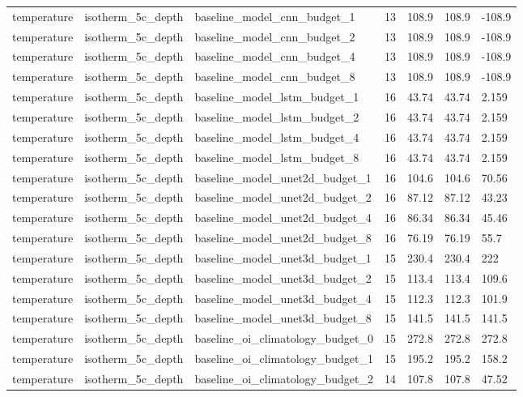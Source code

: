 \begin{table}[htbp]
\begin{tabular}{lllllll}
temperature & isotherm\_5c\_depth & baseline\_model\_cnn\_budget\_1 & 13 & 108.9 & 108.9 & -108.9 \\
temperature & isotherm\_5c\_depth & baseline\_model\_cnn\_budget\_2 & 13 & 108.9 & 108.9 & -108.9 \\
temperature & isotherm\_5c\_depth & baseline\_model\_cnn\_budget\_4 & 13 & 108.9 & 108.9 & -108.9 \\
temperature & isotherm\_5c\_depth & baseline\_model\_cnn\_budget\_8 & 13 & 108.9 & 108.9 & -108.9 \\
temperature & isotherm\_5c\_depth & baseline\_model\_lstm\_budget\_1 & 16 & 43.74 & 43.74 & 2.159 \\
temperature & isotherm\_5c\_depth & baseline\_model\_lstm\_budget\_2 & 16 & 43.74 & 43.74 & 2.159 \\
temperature & isotherm\_5c\_depth & baseline\_model\_lstm\_budget\_4 & 16 & 43.74 & 43.74 & 2.159 \\
temperature & isotherm\_5c\_depth & baseline\_model\_lstm\_budget\_8 & 16 & 43.74 & 43.74 & 2.159 \\
temperature & isotherm\_5c\_depth & baseline\_model\_unet2d\_budget\_1 & 16 & 104.6 & 104.6 & 70.56 \\
temperature & isotherm\_5c\_depth & baseline\_model\_unet2d\_budget\_2 & 16 & 87.12 & 87.12 & 43.23 \\
temperature & isotherm\_5c\_depth & baseline\_model\_unet2d\_budget\_4 & 16 & 86.34 & 86.34 & 45.46 \\
temperature & isotherm\_5c\_depth & baseline\_model\_unet2d\_budget\_8 & 16 & 76.19 & 76.19 & 55.7 \\
temperature & isotherm\_5c\_depth & baseline\_model\_unet3d\_budget\_1 & 15 & 230.4 & 230.4 & 222 \\
temperature & isotherm\_5c\_depth & baseline\_model\_unet3d\_budget\_2 & 15 & 113.4 & 113.4 & 109.6 \\
temperature & isotherm\_5c\_depth & baseline\_model\_unet3d\_budget\_4 & 15 & 112.3 & 112.3 & 101.9 \\
temperature & isotherm\_5c\_depth & baseline\_model\_unet3d\_budget\_8 & 15 & 141.5 & 141.5 & 141.5 \\
temperature & isotherm\_5c\_depth & baseline\_oi\_climatology\_budget\_0 & 15 & 272.8 & 272.8 & 272.8 \\
temperature & isotherm\_5c\_depth & baseline\_oi\_climatology\_budget\_1 & 15 & 195.2 & 195.2 & 158.2 \\
temperature & isotherm\_5c\_depth & baseline\_oi\_climatology\_budget\_2 & 14 & 107.8 & 107.8 & 47.52 \\

\end{tabular}
\end{table}
